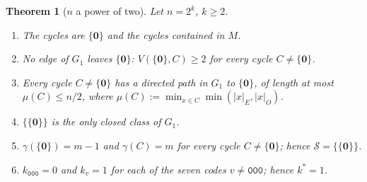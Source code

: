 \documentclass[10pt,a4paper]{article}
\newtheorem{theorem}{Theorem}[section]
\newcommand{\zero}{\mathbf{0}}                %
\newcommand{\Sel}{\mathcal{S}}                %
\newcommand{\Gone}{G_1}                       %
\newcommand{\kst}{k^{*}}
\newcommand{\code}[1]{\mathtt{#1}}            %
\begin{document}
\begin{theorem}[$n$ a power of two]\label{154:thm:pow2}
Let $n=2^k$, $k\ge 2$.
\begin{enumerate}[label=\textup{(\alph*)},nosep,leftmargin=2.2em]
\item The cycles are $\{\zero\}$ and the cycles contained in $M$.
\item No edge of $\Gone$ leaves $\{\zero\}$: $V(\{\zero\},C)\ge 2$ for every cycle $C\neq\{\zero\}$.
\item Every cycle $C\neq\{\zero\}$ has a directed path in $\Gone$ to $\{\zero\}$, of length at most
$\mu(C)\le n/2$, where $\mu(C):=\min_{x\in C}\min(|x|_E,|x|_O)$.
\item $\{\{\zero\}\}$ is the only closed class of $\Gone$.
\item $\gamma(\{\zero\})=m-1$ and $\gamma(C)=m$ for every cycle $C\neq\{\zero\}$; hence $\Sel=\{\{\zero\}\}$.
\item $k_{\code{000}}=0$ and $k_v=1$ for each of the seven codes $v\neq\code{000}$; hence $\kst=1$.
\end{enumerate}
\end{theorem}
\end{document}
